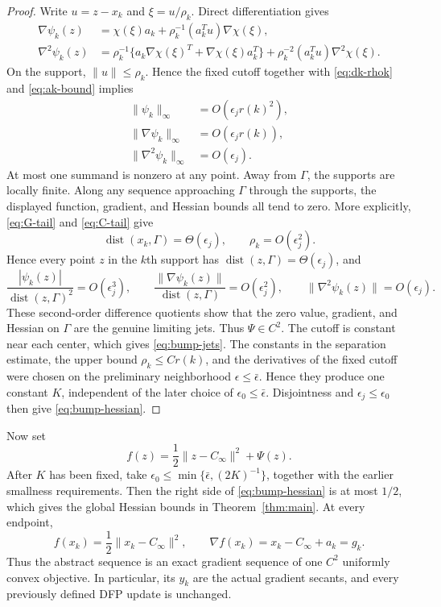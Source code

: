 \documentclass[smallextended,envcountsame]{svjour3}
\begin{document}
\begin{proof}
Write $u=z-x_k$ and $\xi=u/\rho_k$.  Direct differentiation gives
\begin{align*}
\nabla\psi_k(z)
&=\chi(\xi)a_k
+\rho_k^{-1}(a_k^Tu)\nabla\chi(\xi),\\
\nabla^2\psi_k(z)
&=\rho_k^{-1}\{a_k\nabla\chi(\xi)^T
+\nabla\chi(\xi)a_k^T\}
+\rho_k^{-2}(a_k^Tu)\nabla^2\chi(\xi).
\end{align*}
On the support, $\|u\|\le\rho_k$.  Hence the fixed cutoff together with
\eqref{eq:dk-rhok} and \eqref{eq:ak-bound} implies
\begin{align*}
\|\psi_k\|_\infty&=O(\epsilon_jr(k)^2),\\
\|\nabla\psi_k\|_\infty&=O(\epsilon_jr(k)),\\
\|\nabla^2\psi_k\|_\infty&=O(\epsilon_j).
\end{align*}
At most one summand is nonzero at any point.  Away from $\Gamma$, the supports
are locally finite.  Along any sequence approaching $\Gamma$ through the
supports, the displayed function, gradient, and Hessian bounds all tend to
zero.  More explicitly, \eqref{eq:G-tail} and \eqref{eq:C-tail} give
\[
\operatorname{dist}(x_k,\Gamma)=\Theta(\epsilon_j),
\qquad \rho_k=O(\epsilon_j^2).
\]
Hence every point $z$ in the $k$th support has
$\operatorname{dist}(z,\Gamma)=\Theta(\epsilon_j)$, and
\[
\frac{|\psi_k(z)|}{\operatorname{dist}(z,\Gamma)^2}=O(\epsilon_j^3),
\qquad
\frac{\|\nabla\psi_k(z)\|}{\operatorname{dist}(z,\Gamma)}
=O(\epsilon_j^2),
\qquad
\|\nabla^2\psi_k(z)\|=O(\epsilon_j).
\]
These second-order difference quotients show that the zero value, gradient,
and Hessian on $\Gamma$ are the genuine limiting jets.  Thus $\Psi\in C^2$.
The cutoff is constant near each center, which gives
\eqref{eq:bump-jets}.  The constants in the separation estimate, the upper
bound $\rho_k\le Cr(k)$, and the derivatives of the fixed cutoff were chosen
on the preliminary neighborhood $\epsilon\le\bar\epsilon$.  Hence they
produce one constant $K$, independent of the later choice of
$\epsilon_0\le\bar\epsilon$.  Disjointness and
$\epsilon_j\le\epsilon_0$ then give \eqref{eq:bump-hessian}.
\end{proof}

Now set
\begin{equation}\label{eq:objective}
f(z)=\frac12\|z-C_\infty\|^2+\Psi(z).
\end{equation}
After $K$ has been fixed, take
$\epsilon_0\le\min\{\bar\epsilon,(2K)^{-1}\}$, together with the earlier
smallness requirements.  Then the right side of
\eqref{eq:bump-hessian} is at most $1/2$, which gives the global Hessian
bounds in Theorem~\ref{thm:main}.  At every endpoint,
\begin{equation}\label{eq:endpoint-data}
f(x_k)=\frac12\|x_k-C_\infty\|^2,
\qquad
\nabla f(x_k)=x_k-C_\infty+a_k=g_k.
\end{equation}
Thus the abstract sequence is an exact gradient sequence of one $C^2$
uniformly convex objective.  In particular, its $y_k$ are the actual gradient
secants, and every previously defined DFP update is unchanged.
\end{document}
